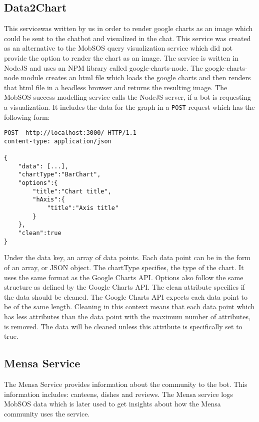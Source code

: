 \subsection{Data2Chart}
This service\footnotemark was written by us in order to render google charts as an image which could be sent to the chatbot and visualized in the chat. This service was created as an alternative to the MobSOS query visualization service which did not provide the option to render the chart as an image. 
The service is written in NodeJS and uses an NPM library called google-charts-node\footnotemark.
The google-charts-node module creates an html file which loads the google charts and then renders that html file in a headless browser \footnotemark and returns the resulting image.
The MobSOS success modelling service calls the NodeJS server, if a bot is requesting a visualization. It includes the data for the graph in a \texttt{POST} request which has the following form:
\begin{lstlisting}
POST  http://localhost:3000/ HTTP/1.1
content-type: application/json

{
    "data": [...],
    "chartType":"BarChart",
    "options":{
        "title":"Chart title",
        "hAxis":{
            "title":"Axis title"
        }
    },
    "clean":true 
}
\end{lstlisting}
Under the data key, an array of data points. Each data point can be in the form of an array, or JSON object. 
The chartType specifies, the type of the chart. It uses the same format as the Google Charts API. 
Options also follow the same structure as defined by the Google Charts API.
The clean attribute specifies if the data should be cleaned. The Google Charts API expects each data point to be of the same length. Cleaning in this context means that each data point which has less attributes than the data point with the maximum number of attributes, is removed.
The data will be cleaned unless this attribute is specifically set to true.  

\subsection{Mensa Service}
The Mensa Service provides information about the community to the bot. This information includes: canteens, dishes and reviews. The Mensa service logs MobSOS data which is later used to get insights about how the Mensa community uses the service.

